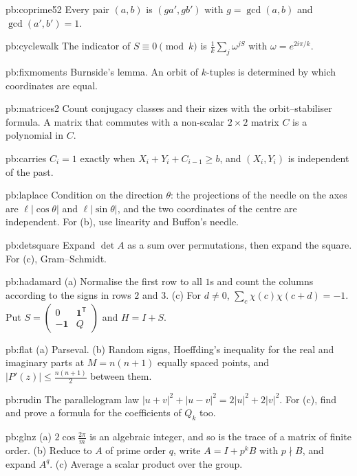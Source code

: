 \begin{hint}{pb:coprime52}
Every pair $(a,b)$ is $(ga',gb')$ with $g=\gcd(a,b)$ and $\gcd(a',b')=1$.
\end{hint}
\begin{hint}{pb:cyclewalk}
The indicator of $S\equiv0\pmod k$ is $\frac1k\sum_j\omega^{jS}$ with $\omega=e^{2i\pi/k}$.
\end{hint}
\begin{hint}{pb:fixmoments}
Burnside's lemma. An orbit of $k$-tuples is determined by which coordinates are equal.
\end{hint}
\begin{hint}{pb:matrices2}
Count conjugacy classes and their sizes with the orbit--stabiliser formula. A matrix that commutes with a non-scalar
$2\times2$ matrix $C$ is a polynomial in $C$.
\end{hint}
\begin{hint}{pb:carries}
$C_i=1$ exactly when $X_i+Y_i+C_{i-1}\ge b$, and $(X_i,Y_i)$ is independent of the past.
\end{hint}
\begin{hint}{pb:laplace}
Condition on the direction $\theta$: the projections of the needle on the axes are $\ell|\cos\theta|$ and $\ell|\sin\theta|$,
and the two coordinates of the centre are independent. For (b), use linearity and Buffon's needle.
\end{hint}
\begin{hint}{pb:detsquare}
Expand $\det A$ as a sum over permutations, then expand the square. For (c), Gram--Schmidt.
\end{hint}
\begin{hint}{pb:hadamard}
(a) Normalise the first row to all $1$s and count the columns according to the signs in rows $2$ and $3$. (c) For $d\ne0$,
$\sum_c\chi(c)\chi(c+d)=-1$. Put $S=\begin{pmatrix}0&\mathbf1^{\mathsf T}\\-\mathbf1&Q\end{pmatrix}$ and $H=I+S$.
\end{hint}
\begin{hint}{pb:flat}
(a) Parseval. (b) Random signs, Hoeffding's inequality for the real and imaginary parts at $M=n(n+1)$ equally spaced points,
and $|P'(z)|\le\frac{n(n+1)}2$ between them.
\end{hint}
\begin{hint}{pb:rudin}
The parallelogram law $|u+v|^2+|u-v|^2=2|u|^2+2|v|^2$. For (c), find and prove a formula for the coefficients of $Q_k$ too.
\end{hint}
\begin{hint}{pb:glnz}
(a) $2\cos\frac{2\pi}m$ is an algebraic integer, and so is the trace of a matrix of finite order. (b) Reduce to $A$ of prime
order $q$, write $A=I+p^kB$ with $p\nmid B$, and expand $A^q$. (c) Average a scalar product over the group.
\end{hint}

